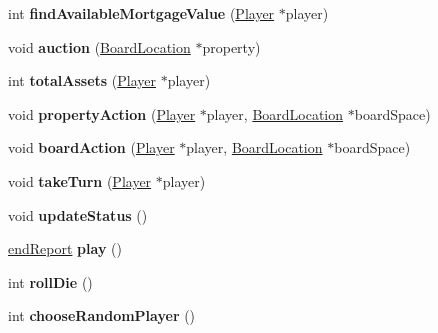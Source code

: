 \begin{DoxyCompactItemize}
\item 
\hypertarget{classGame_ac1806954e18f61abf68ba395715b840b}{int {\bfseries find\-Available\-Mortgage\-Value} (\hyperlink{classPlayer}{Player} $\ast$player)}\label{classGame_ac1806954e18f61abf68ba395715b840b}

\item 
\hypertarget{classGame_a18782bd010ec55a4ea531926688ad091}{void {\bfseries auction} (\hyperlink{classBoardLocation}{Board\-Location} $\ast$property)}\label{classGame_a18782bd010ec55a4ea531926688ad091}

\item 
\hypertarget{classGame_ab7c14f3f6e09f8040cf8270283333d2c}{int {\bfseries total\-Assets} (\hyperlink{classPlayer}{Player} $\ast$player)}\label{classGame_ab7c14f3f6e09f8040cf8270283333d2c}

\item 
\hypertarget{classGame_a2e98d9be160ec73badb3b640957f43c9}{void {\bfseries property\-Action} (\hyperlink{classPlayer}{Player} $\ast$player, \hyperlink{classBoardLocation}{Board\-Location} $\ast$board\-Space)}\label{classGame_a2e98d9be160ec73badb3b640957f43c9}

\item 
\hypertarget{classGame_af529c47be443a04de196731411a89e28}{void {\bfseries board\-Action} (\hyperlink{classPlayer}{Player} $\ast$player, \hyperlink{classBoardLocation}{Board\-Location} $\ast$board\-Space)}\label{classGame_af529c47be443a04de196731411a89e28}

\item 
\hypertarget{classGame_a1b5a12cf8a698efb7dc4eb607dcda376}{void {\bfseries take\-Turn} (\hyperlink{classPlayer}{Player} $\ast$player)}\label{classGame_a1b5a12cf8a698efb7dc4eb607dcda376}

\item 
\hypertarget{classGame_a43b8950da0c337f9710cf33b42196ed1}{void {\bfseries update\-Status} ()}\label{classGame_a43b8950da0c337f9710cf33b42196ed1}

\item 
\hypertarget{classGame_aaec76e1cbfbfa6aa7c3af392517b7389}{\hyperlink{structendReport}{end\-Report} {\bfseries play} ()}\label{classGame_aaec76e1cbfbfa6aa7c3af392517b7389}

\item 
\hypertarget{classGame_aaa89c82ec052653b6a4c10edd7139b72}{int {\bfseries roll\-Die} ()}\label{classGame_aaa89c82ec052653b6a4c10edd7139b72}

\item 
\hypertarget{classGame_a84474cec78664334a09b8e9a4d46f1e9}{int {\bfseries choose\-Random\-Player} ()}\label{classGame_a84474cec78664334a09b8e9a4d46f1e9}


\end{DoxyCompactItemize}

